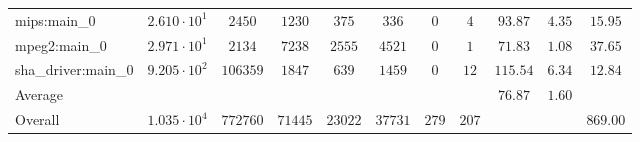 \begin{tabular}{|l|c|c|c|c|c|c|c|c|c|c|}
mips:main\_0            & $ 2.610 \cdot 10^{1} $ & $ 2450   $ & $ 1230  $ & $ 375   $ & $ 336   $ & $ 0   $ & $ 4   $ & $ 93.87       $ & $ 4.35    $ & $ 15.95   $ \\
mpeg2:main\_0           & $ 2.971 \cdot 10^{1} $ & $ 2134   $ & $ 7238  $ & $ 2555  $ & $ 4521  $ & $ 0   $ & $ 1   $ & $ 71.83       $ & $ 1.08    $ & $ 37.65   $ \\
sha\_driver:main\_0     & $ 9.205 \cdot 10^{2} $ & $ 106359 $ & $ 1847  $ & $ 639   $ & $ 1459  $ & $ 0   $ & $ 12  $ & $ 115.54      $ & $ 6.34    $ & $ 12.84   $ \\
\hline
Average                 & $                    $ & $        $ & $       $ & $       $ & $       $ & $     $ & $     $ & $ 76.87       $ & $ 1.60    $ & $         $ \\
\hline
Overall                 & $ 1.035 \cdot 10^{4} $ & $ 772760 $ & $ 71445 $ & $ 23022 $ & $ 37731 $ & $ 279 $ & $ 207 $ & $             $ & $         $ & $ 869.00  $ \\
\hline
\end{tabular}
